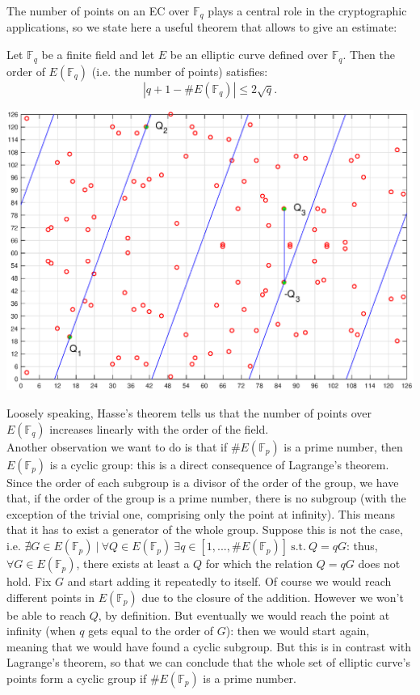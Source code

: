 \bigskip
\noindent
The number of points on an EC over $\mathbb{F}_q$ plays a central role in the cryptographic applications, so we state here a useful theorem that allows to give an estimate:
\begin{thm}  Let $\mathbb{F}_q$ be a finite field and let $E$ be an elliptic curve defined over $\mathbb{F}_q$. Then the order of $E(\mathbb{F}_q)$ (i.e. the number of points) satisfies: $$|q + 1 - \#E(\mathbb{F}_q)| \leq 2\sqrt{q}.$$
\end{thm}
\begin{center}
	\includegraphics[width=0.9\linewidth]{Images/sum_ec_over_ff.eps}
	\label{fig:figure5}
\end{center}
\noindent
Loosely speaking, Hasse's theorem tells us that the number of points over $E(\mathbb{F}_q)$ increases linearly with the order of the field.
\\
Another observation we want to do is that if $\#E(\mathbb{F}_p)$ is a prime number, then $E(\mathbb{F}_p)$ is a cyclic group: this is a direct consequence of Lagrange's theorem. Since the order of each subgroup is a divisor of the order of the group, we have that, if the order of the group is a prime number, there is no subgroup (with the exception of the trivial one, comprising only the point at infinity). This means that it has to exist a generator of the whole group. Suppose this is not the case, i.e. $\nexists G \in E(\mathbb{F}_p) \ | \ \forall Q \in E(\mathbb{F}_p) \ \exists q \in [1, ..., \#E(\mathbb{F}_p)] \ \text{s.t.} \ Q = qG$: thus, $\forall G \in E(\mathbb{F}_p)$, there exists at least a $Q$ for which the relation $Q = qG$ does not hold. Fix $G$ and start adding it repeatedly to itself. Of course we would reach different points in $E(\mathbb{F}_p)$ due to the closure of the addition. However we won't be able to reach $Q$, by definition. But eventually we would reach the point at infinity (when $q$ gets equal to the order of $G$): then we would start again, meaning that we would have found a cyclic subgroup. But this is in contrast with Lagrange's theorem, so that we can conclude that the whole set of elliptic curve's points form a cyclic group if $\#E(\mathbb{F}_p)$ is a prime number.

